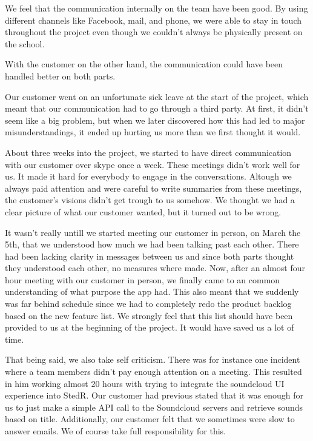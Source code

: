 We feel that the communication internally on the team have been good. By using different channels like Facebook, mail, and phone, we were able to stay in touch throughout the project even though we couldn't always be physically present on the school.

With the customer on the other hand, the communication could have been handled better on both parts. 

Our customer went on an unfortunate sick leave at the start of the project, which meant that our communication had to go through a third party. At first, it didn't seem like a big problem, but when we later discovered how this had led to major misunderstandings, it ended up hurting us more than we first thought it would.

About three weeks into the project, we started to have direct communication with our customer over skype once a week. These meetings didn't work well for us. It made it hard for everybody to engage in the conversations. Altough we always paid attention and were careful to write summaries from these meetings, the customer's visions didn't get trough to us somehow. We thought we had a clear picture of what our customer wanted, but it turned out to be wrong.

It wasn't really untill we started meeting our customer in person, on March the 5th, that we understood how much we had been talking past each other. There had been lacking clarity in messages between us and since both parts thought they understood each other, no measures where made. Now, after an almost four hour meeting with our customer in person, we finally came to an common understanding of what purpose the app had. This also meant that we suddenly was far behind schedule since we had to completely redo the product backlog based on the new feature list. We strongly feel that this list should have been provided to us at the beginning of the project. It would have saved us a lot of time.

That being said, we also take self criticism. There was for instance one incident where a team members didn't pay enough attention on a meeting. This resulted in him working almost 20 hours with trying to integrate the soundcloud UI experience into StedR. Our customer had previous stated that it was enough for us to just make a simple API call to the Soundcloud servers and retrieve sounds based on title. Additionally, our customer felt that we sometimes were slow to answer emails. We of course take full responsibility for this. 


